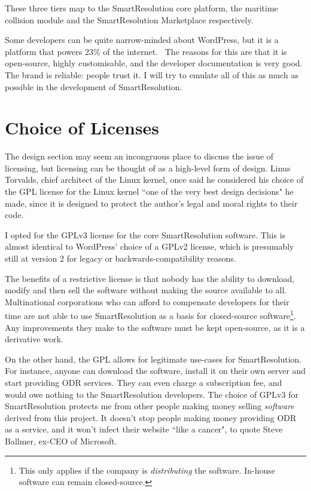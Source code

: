 These three tiers map to the SmartResolution core platform, the maritime collision module and the SmartResolution Marketplace respectively.

Some developers can be quite narrow-minded about WordPress, but it is a platform that powers 23\% of the internet.~\cite{wordpressPopular} The reasons for this are that it is open-source, highly customisable, and the developer documentation is very good. The brand is reliable: people trust it. I will try to emulate all of this as much as possible in the development of SmartResolution.

\section{Choice of Licenses}

The design section may seem an incongruous place to discuss the issue of licensing, but licensing can be thought of as a high-level form of design. Linus Torvalds, chief architect of the Linux kernel, once said he considered his choice of the GPL license for the Linux kernel ``one of the very best design decisions" he made, since it is designed to protect the author's legal and moral rights to their code.~\cite{linusLinux}

I opted for the GPLv3 license for the core SmartResolution software. This is almost identical to WordPress' choice of a GPLv2 license, which is presumably still at version 2 for legacy or backwards-compatibility reasons.

The benefits of a restrictive license is that nobody has the ability to download, modify and then sell the software without making the source available to all. Multinational corporations who can afford to compensate developers for their time are not able to use SmartResolution as a basis for closed-source software\footnote{This only applies if the company is \emph{distributing} the software. In-house software can remain closed-source.}. Any improvements they make to the software must be kept open-source, as it is a derivative work.

On the other hand, the GPL allows for legitimate use-cases for SmartResolution. For instance, anyone can download the software, install it on their own server and start providing ODR services. They can even charge a subscription fee, and would owe nothing to the SmartResolution developers. The choice of GPLv3 for SmartResolution protects me from other people making money selling \emph{software} derived from this project. It doesn't stop people making money providing ODR as a service, and it won't infect their website ``like a cancer", to quote Steve Ballmer, ex-CEO of Microsoft.~\cite{linuxCancer}

